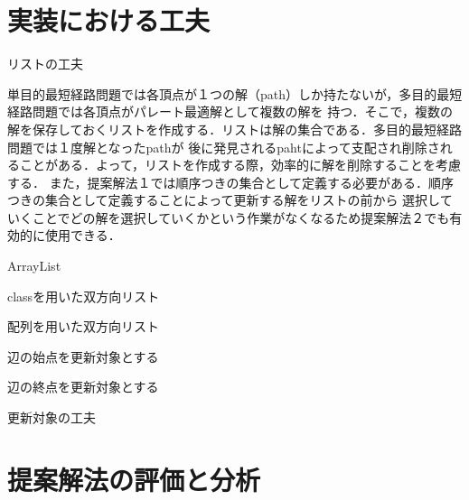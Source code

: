 \documentclass[12pt]{optlab-bachelor}
\begin{document}
\section{実装における工夫}

\begin{description}
  \item[リストの工夫]
\end{description}

単目的最短経路問題では各頂点が１つの解（path）しか持たないが，多目的最短経路問題では各頂点がパレート最適解として複数の解を
持つ．そこで，複数の解を保存しておくリストを作成する．リストは解の集合である．多目的最短経路問題では１度解となったpathが
後に発見されるpahtによって支配され削除されることがある．よって，リストを作成する際，効率的に解を削除することを考慮する．
また，提案解法１では順序つきの集合として定義する必要がある．順序つきの集合として定義することによって更新する解をリストの前から
選択していくことでどの解を選択していくかという作業がなくなるため提案解法２でも有効的に使用できる．

\begin{description}
  \item[ArrayList]
\end{description}



\begin{description}
  \item[classを用いた双方向リスト]
\end{description}

\begin{description}
  \item[配列を用いた双方向リスト]
\end{description}

\begin{description}
  \item[辺の始点を更新対象とする]
\end{description}

\begin{description}
  \item[辺の終点を更新対象とする]
\end{description}

\begin{description}
  \item[更新対象の工夫]
\end{description}

\section{提案解法の評価と分析}
\end{document}
